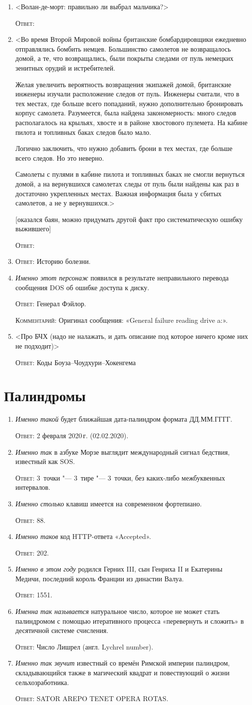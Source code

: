 \documentclass[a4paper,10pt]{article}
\let\keyword\textsc
\newenvironment{topic}{\begin{enumerate}}{\end{enumerate}}
\newcommand{\question}[3]{\item[#1.] #2 \par \keyword{Ответ:} #3}
\newcommand{\commentary}[1]{\par \keyword{Комментарий:} #1}
\newcommand{\additional}{$\Im$}
\begin{document}
\begin{topic}
 \question{10}{<Волан-де-морт: правильно ли выбрал мальчика?>}{}
 \question{20}{<Во время Второй Мировой войны британские бомбардировщики ежедневно отправлялись бомбить немцев. Большинство самолетов не возвращалось домой, а те, что возвращались, были покрыты следами от пуль немецких зенитных орудий и истребителей.

 Желая увеличить вероятность возвращения экипажей домой, британские инженеры изучали расположение следов от пуль. Инженеры считали, что в тех местах, где больше всего попаданий, нужно дополнительно бронировать корпус самолета. Разумеется, была найдена закономерность: много следов располагалось на крыльях, хвосте и в районе хвостового пулемета. На кабине пилота и топливных баках следов было мало.

 Логично заключить, что нужно добавить брони в тех местах, где больше всего следов. Но это неверно.

 Самолеты с пулями в кабине пилота и топливных баках не смогли вернуться домой, а на вернувшихся самолетах следы от пуль были найдены как раз в достаточно укрепленных местах. Важная информация была у сбитых самолетов, а не у вернувшихся.>

 [оказался баян, можно придумать другой факт про систематическую ошибку выжившего]}{}
 \question{30}{<вопрос про одноимённую песню Высоцкого: именно это на самом деле>}{Историю болезни.}
 \question{40}{\emph{Именно этот персонаж} появился в результате неправильного перевода сообщения DOS об ошибке доступа к диску.}{Генерал Фэйлор.}\commentary{Оригинал сообщения: «General failure reading drive a:».}
 \question{50}{<Про БЧХ (надо не налажать, и дать описание под которое ничего кроме них не подходит)>}{Коды Боуза–Чоудхури–Хокенгема}
\end{topic}



\newpage
\section{Палиндромы}

\begin{topic}
 \question{\additional}{\emph{Именно такой} будет ближайшая дата-палиндром формата ДД.ММ.ГГГГ.}{2 февраля 2020\,г. (02.02.2020).}
 \question{\additional}{\emph{Именно так} в азбуке Морзе выглядит международный сигнал бедствия, известный как SOS.}{3~точки "--- 3~тире "--- 3~точки, без каких-либо межбуквенных интервалов.}
 \question{10}{\emph{Именно столько} клавиш имеется на современном фортепиано.}{88.}
 \question{20}{\emph{Именно таков} код HTTP-ответа «Accepted».}{202.}
 \question{30}{\emph{Именно в этом году} родился Герних III, сын Генриха II и Екатерины Медичи, последний король Франции из династии Валуа.}{1551.}
 \question{40}{\emph{Именна так называется} натуральное число, которое не может стать палиндромом с помощью итеративного процесса «перевернуть и сложить» в десятичной системе счисления.}{Число Лишрел (англ. Lychrel number).}
 \question{50}{\emph{Именно так звучит} известный со времён Римской империи палиндром, складывающийся также в магический квадрат и повествующий о жизни сельхозработника.}{SATOR AREPO TENET OPERA ROTAS.}
\end{topic}
\end{document}
